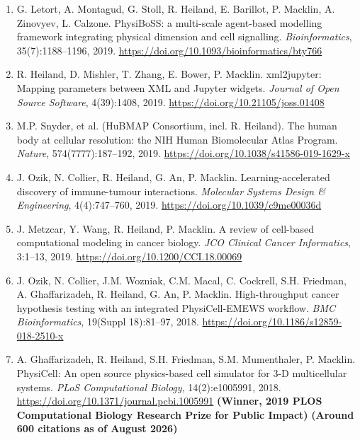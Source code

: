 \documentclass[11pt]{article}
\begin{document}
\begin{enumerate}[leftmargin=*, itemsep=3pt, topsep=4pt]
    \item G. Letort, A. Montagud, G. Stoll, R. Heiland, E. Barillot, P. Macklin, A. Zinovyev, L. Calzone. PhysiBoSS: a multi-scale agent-based modelling framework integrating physical dimension and cell signalling. \textit{Bioinformatics}, 35(7):1188--1196, 2019. \url{https://doi.org/10.1093/bioinformatics/bty766}

    \item R. Heiland, D. Mishler, T. Zhang, E. Bower, P. Macklin. xml2jupyter: Mapping parameters between XML and Jupyter widgets. \textit{Journal of Open Source Software}, 4(39):1408, 2019. \url{https://doi.org/10.21105/joss.01408}

    \item M.P. Snyder, et al. (HuBMAP Consortium, incl. R. Heiland). The human body at cellular resolution: the NIH Human Biomolecular Atlas Program. \textit{Nature}, 574(7777):187--192, 2019. \url{https://doi.org/10.1038/s41586-019-1629-x}

    \item J. Ozik, N. Collier, R. Heiland, G. An, P. Macklin. Learning-accelerated discovery of immune-tumour interactions. \textit{Molecular Systems Design \& Engineering}, 4(4):747--760, 2019. \url{https://doi.org/10.1039/c9me00036d}

    \item J. Metzcar, Y. Wang, R. Heiland, P. Macklin. A review of cell-based computational modeling in cancer biology. \textit{JCO Clinical Cancer Informatics}, 3:1--13, 2019. \url{https://doi.org/10.1200/CCI.18.00069}

    \item J. Ozik, N. Collier, J.M. Wozniak, C.M. Macal, C. Cockrell, S.H. Friedman, A. Ghaffarizadeh, R. Heiland, G. An, P. Macklin. High-throughput cancer hypothesis testing with an integrated PhysiCell-EMEWS workflow. \textit{BMC Bioinformatics}, 19(Suppl 18):81--97, 2018. \url{https://doi.org/10.1186/s12859-018-2510-x}

    \item A. Ghaffarizadeh, R. Heiland, S.H. Friedman, S.M. Mumenthaler, P. Macklin. PhysiCell: An open source physics-based cell simulator for 3-D multicellular systems. \textit{PLoS Computational Biology}, 14(2):e1005991, 2018. \url{https://doi.org/10.1371/journal.pcbi.1005991} \newline \textbf{(Winner, 2019 PLOS Computational Biology Research Prize for Public Impact)} \newline \textbf{(Around 600 citations as of August 2026)}


\end{enumerate}
\end{document}
